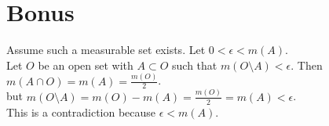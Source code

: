 \documentclass[12pt]{article}
\begin{document}
\clearpage
\section*{Bonus}
Assume such a measurable set exists. Let $0 < \epsilon < m(A)$.\\
Let $O$ be an open set with $A \subset O$ such that $m(O\setminus A) < \epsilon$. Then $m(A \cap O)=m(A)=\frac{m(O)}{2}$. \\
but $m(O \setminus A)=m(O)-m(A)=\frac{m(O)}{2}=m(A) <\epsilon$. \\
This is a contradiction because $\epsilon < m(A)$.
\end{document}
